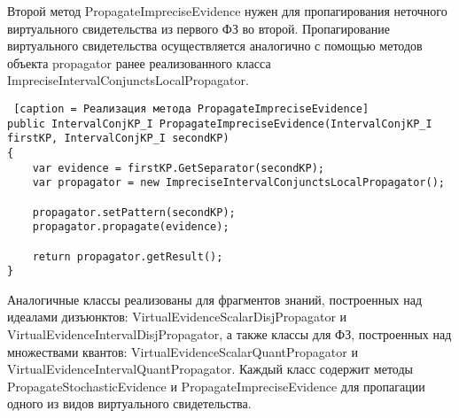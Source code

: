 Второй метод PropagateImpreciseEvidence нужен для пропагирования неточного виртуального свидетельства из первого ФЗ во второй. Пропагирование виртуального свидетельства осуществляется аналогично с помощью методов объекта propagator ранее реализованного класса ImpreciseIntervalConjunctsLocalPropagator.
\begin{lstlisting} [caption = Реализация метода PropagateImpreciseEvidence]
public IntervalConjKP_I PropagateImpreciseEvidence(IntervalConjKP_I firstKP, IntervalConjKP_I secondKP)
{
    var evidence = firstKP.GetSeparator(secondKP);
    var propagator = new ImpreciseIntervalConjunctsLocalPropagator();

    propagator.setPattern(secondKP);
    propagator.propagate(evidence);

    return propagator.getResult();
}\end{lstlisting}

Аналогичные классы реализованы для фрагментов знаний, построенных над идеалами дизъюнктов: VirtualEvidenceScalarDisjPropagator и VirtualEvidenceIntervalDisjPropagator, а также классы для ФЗ, построенных над множествами квантов: VirtualEvidenceScalarQuantPropagator и VirtualEvidenceIntervalQuantPropagator.  Каждый класс содержит методы PropagateStochasticEvidence и PropagateImpreciseEvidence для пропагации одного из видов виртуального свидетельства.

	   